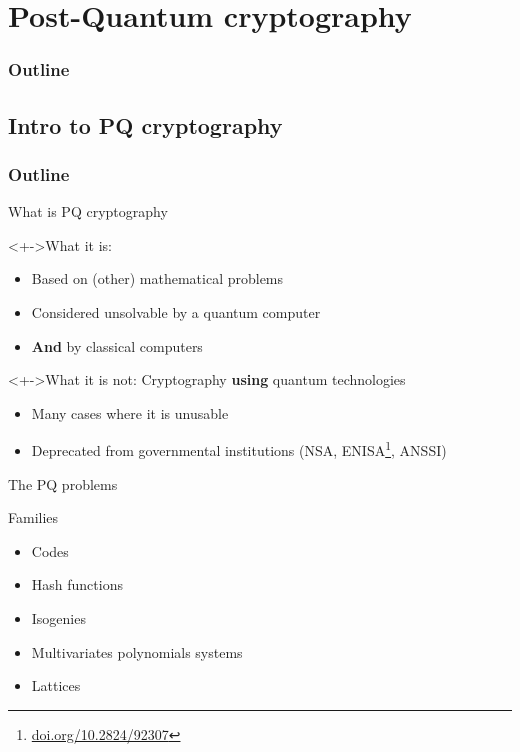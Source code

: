 \documentclass{beamer}
\begin{document}
\section{Post-Quantum cryptography}
\begin{frame}
  \frametitle{Outline}
  \tableofcontents[currentsection]
\end{frame}

\subsection{Intro to PQ cryptography}
\begin{frame}
  \frametitle{Outline}
\end{frame}

\begin{frame}{What is PQ cryptography}
	\begin{block}<+->{What it is:}
		\begin{itemize}
			\item Based on (other) mathematical problems
			\item Considered unsolvable by a quantum computer
			\item<+-> \textbf{And} by classical computers
		\end{itemize}
	\end{block}

	\begin{block}<+->{What it is not:}
		Cryptography \textbf{using} quantum technologies
		\begin{itemize}
			\item Many cases where it is unusable
			\item Deprecated from governmental institutions (NSA, ENISA\footnote{\url{doi.org/10.2824/92307}}, ANSSI)
		\end{itemize}
	\end{block}
\end{frame}

\begin{frame}{The PQ problems}
	\begin{block}{Families}
		\begin{itemize}
			\item Codes
			\item Hash functions %
			\item Isogenies
			\item Multivariates polynomials systems
			\item { Lattices}
		\end{itemize}
	\end{block}
\end{frame}
\end{document}
